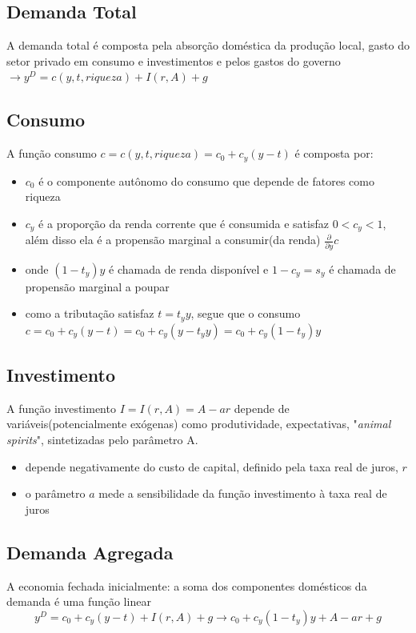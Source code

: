 \documentclass[a4paper,12pt]{article}[abntex2]
\begin{document}
\subsection{\textbf{Demanda Total}}
A demanda total é composta pela absorção doméstica da produção local, gasto do setor privado em consumo e investimentos e pelos gastos do governo $\rightarrow y^D=c(y,t,riqueza)+I(r,A)+g$ 

\subsection{\textbf{Consumo}}
A função consumo $c =c (y,t,riqueza) =c_0+c_y(y-t)$ é composta por: \begin{itemize}
    \item $c_0$ é o componente autônomo do consumo que depende de fatores como riqueza
    \item $c_y$ é a proporção da renda corrente que é consumida e satisfaz $0<c_y<1$, além disso ela é a propensão marginal a consumir(da renda) $\frac{\partial}{\partial y}c$ 
    \item onde $(1-t_y)y$ é chamada de renda disponível e $1-c_y=s_y$ é chamada de propensão marginal a poupar
    \item como a tributação satisfaz $t=t_yy$, segue que o consumo $c = c_0+c_y(y-t)=c_0+c_y(y-t_yy)=c_0+c_y(1-t_y)y$
\end{itemize}

\subsection{\textbf{Investimento}}
A função investimento $I=I(r,A)=A-ar$ depende de variáveis(potencialmente exógenas) como produtividade, expectativas, "\textit{animal spirits}", sintetizadas pelo parâmetro A.\begin{itemize}
    \item depende  negativamente do custo de capital, definido pela taxa real de juros, $r$
    \item o parâmetro $a$ mede a sensibilidade da função investimento à taxa real de juros
\end{itemize}

\subsection{\textbf{Demanda Agregada}}
A economia fechada inicialmente: a soma dos componentes domésticos da demanda é uma função linear
$$
y^D=c_0+c_y(y-t)+I(r,A)+g \rightarrow c_0+c_y(1-t_y)y+A-ar+g
$$
\end{document}

